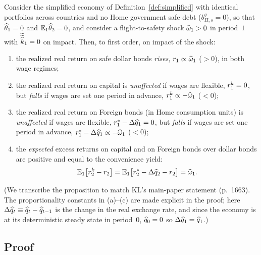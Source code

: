 \begin{proposition}
\label{prop:returns}
Consider the simplified economy of Definition~\ref{def:simplified} with identical
portfolios across countries and no Home government safe debt ($b^g_{H,s}=0$), so
that $\widehat{\theta}_1=0$ and $\mathbb{E}_1\widehat{\theta}_2=0$, and consider a flight-to-safety
shock $\widehat{\omega}_1>0$ in period~$1$ with $\widetilde{\widetilde{\widehat{k}}}_1=0$ on
impact. Then, to first order, on impact of the shock:
\begin{enumerate}[label=(\alph*),leftmargin=1.8em,itemsep=3pt]
  \item the realized real return on safe dollar bonds \emph{rises},
  $r_1\propto\widehat{\omega}_1$ ($>0$), in both wage regimes;
  \item the realized real return on capital is \emph{unaffected} if wages are
  flexible, $r^{k}_1=0$, but \emph{falls} if wages are set one period in advance,
  $r^{k}_1\propto-\widehat{\omega}_1$ ($<0$);
  \item the realized real return on Foreign bonds (in Home consumption units) is
  \emph{unaffected} if wages are flexible, $r^{*}_1-\Delta\widehat{q}_1=0$, but
  \emph{falls} if wages are set one period in advance,
  $r^{*}_1-\Delta\widehat{q}_1\propto-\widehat{\omega}_1$ ($<0$);
  \item the \emph{expected} excess returns on capital and on Foreign bonds over
  dollar bonds are positive and equal to the convenience yield:
  \begin{equation}
  \mathbb{E}_1\bigl[r^{k}_2-r_2\bigr]
  =\mathbb{E}_1\bigl[r^{*}_2-\Delta\widehat{q}_2-r_2\bigr]
  =\widehat{\omega}_1. \label{eq:prop2-wedge}
  \end{equation}
\end{enumerate}
\end{proposition}

\noindent (We transcribe the proposition to match KL's main-paper statement
(p.~1663). The proportionality constants in (a)--(c) are made explicit in the
proof; here $\Delta\widehat{q}_t\equiv\widehat{q}_t-\widehat{q}_{t-1}$ is the change in
the real exchange rate, and since the economy is at its deterministic steady
state in period~$0$, $\widehat{q}_0=0$ so $\Delta\widehat{q}_1=\widehat{q}_1$.)

\subsection{Proof}

